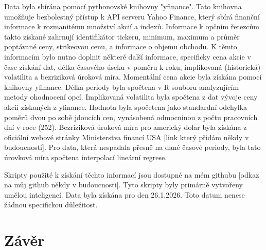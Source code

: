 \documentclass{article}
\begin{document}
  Data byla sbírána pomocí pythonovské knihovny "yfinance". Tato knihovna umožňuje bezbolestný přístup k API serveru Yahoo Finance, který sbírá finanční informace k rozmanitému množství akcií a indexů.
  Informace k opčním řetezcům takto získané zahrnují identifikátor tickeru, minimum, maximum a průměr poptávané ceny, strikeovou cenu, a informace o objemu obchodu.
  K těmto informacím bylo nutno doplnit některé další informace, specificky cena akcie v čase získání dat, délka časového úseku v poměru k roku, implikovaná (historická) volatilita a bezriziková úroková míra.
  Momentální cena akcie byla získána pomocí knihovny yfinance.
  Délka periody byla spočtena v R souboru analyzujícím metody ohodnocení opcí.
  Implikovaná volatilita byla spočtena z dat vývoje ceny akcií získaných z yfinance. Hodnota byla spočetena jako standardní odchylka poměrů dvou po sobě jdoucích cen, vynásobená odmocninou z počtu pracovních dní v roce (252).
  Bezriziková úroková míra pro americký dolar byla získána z oficiální webové stránky Ministerstva financí USA [link který přidám někdy v budoucnosti]. Pro data, která nespadala přesně na dané časové periody, byla tato úrovková míra spočtena interpolací lineární regrese. 

  Skripty použité k získání těchto informací jsou dostupné na mém githubu [odkaz na můj github někdy v budoucnosti]. Tyto skripty byly primárně vytvořeny umělou inteligencí.
  Data byla získána pro den 26.1.2026. Toto datum nenese žádnou specifickou důležitost.

  \section{Závěr}

  \printbibliography
  
\end{document}
